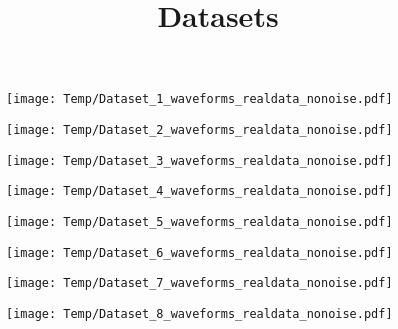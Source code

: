 \documentclass[14pt,a4paper]{extarticle}
\title{Datasets}
\author{}
\date{}
\begin{document}
\begin{figure}
\centering
\texttt{[image: Temp/Dataset\_1\_waveforms\_realdata\_nonoise.pdf]}
\end{figure}

\begin{figure}
\centering
\texttt{[image: Temp/Dataset\_2\_waveforms\_realdata\_nonoise.pdf]}
\end{figure}

\begin{figure}
\centering
\texttt{[image: Temp/Dataset\_3\_waveforms\_realdata\_nonoise.pdf]}
\end{figure}

\begin{figure}
\centering
\texttt{[image: Temp/Dataset\_4\_waveforms\_realdata\_nonoise.pdf]}
\end{figure}

\begin{figure}
\centering
\texttt{[image: Temp/Dataset\_5\_waveforms\_realdata\_nonoise.pdf]}
\end{figure}

\begin{figure}
\centering
\texttt{[image: Temp/Dataset\_6\_waveforms\_realdata\_nonoise.pdf]}
\end{figure}

\begin{figure}
\centering
\texttt{[image: Temp/Dataset\_7\_waveforms\_realdata\_nonoise.pdf]}
\end{figure}

\begin{figure}
\centering
\texttt{[image: Temp/Dataset\_8\_waveforms\_realdata\_nonoise.pdf]}
\end{figure}
\end{document}
